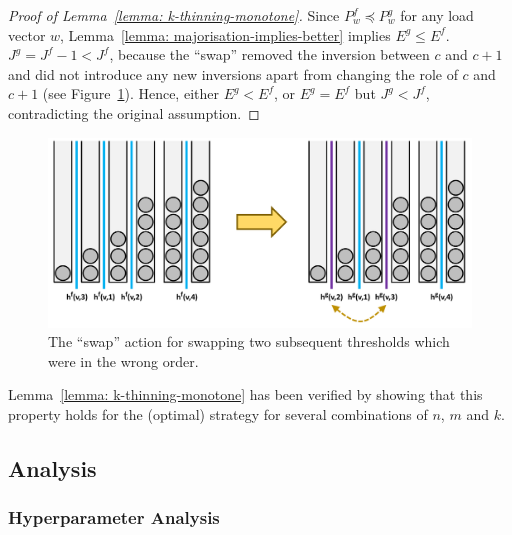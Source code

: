 \begin{proof}[Proof of Lemma~\ref{lemma: k-thinning-monotone}]
    Since $P^f_w\preccurlyeq P^g_w$ for any load vector $w$, Lemma~\ref{lemma: majorisation-implies-better} implies $E^g\leq E^f$. $J^g=J^f-1<J^f$, because the ``swap'' removed the inversion between $c$ and $c+1$ and did not introduce any new inversions apart from changing the role of $c$ and $c+1$ (see Figure~\ref{k-thinning-swap-action}). Hence, either $E^g<E^f$, or $E^g=E^f$ but $J^g<J^f$, contradicting the original assumption.
\end{proof}


\begin{figure}
    \centering
    \includegraphics[scale=0.5]{Chapter4/Figs/k_thinning_swap.pdf}
    \caption{The ``swap'' action for \KThinning swapping two subsequent thresholds which were in the wrong order.}
    \label{k-thinning-swap-action}
\end{figure}

\begin{remark}
Lemma~\ref{lemma: k-thinning-monotone} has been verified by showing that this property holds for the (optimal) \DP strategy for several combinations of $n$, $m$ and $k$.
\end{remark}


\subsection{\DQL Analysis}



\subsubsection{Hyperparameter Analysis}



